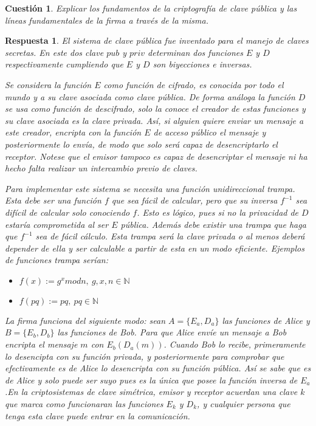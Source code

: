 \documentclass[
  a4paper,
  spanish,
  12pt,
]{scrartcl}
\theoremstyle{ejercicio-style}
\newtheorem{ejer}{Cuestión}
\theoremstyle{remark-style}
\newtheorem*{sol}{Respuesta}
\theoremstyle{teorema-style}
\begin{document}
\begin{ejer}
  Explicar los fundamentos de la criptografía de clave pública y las líneas fundamentales de la firma a través de la misma.
\end{ejer}
\begin{sol}

  El sistema de clave pública fue inventado para el manejo de claves secretas. En este dos clave $pub$ y $priv$ determinan dos funciones $E$ y $D$ respectivamente cumpliendo que $E$ y $D$ son biyecciones e inversas.

  Se considera la función $E$ como función de cifrado, es conocida por todo el mundo y a su clave asociada como clave pública. De forma análoga la función $D$ se usa como función de descifrado, solo la conoce el creador de estas funciones y su clave asociada es la clave privada. Así, si alguien quiere enviar un mensaje a este creador, encripta con la función $E$ de acceso público el mensaje y posteriormente lo envía, de modo que solo será capaz de desencriptarlo el receptor. Notese que el emisor tampoco es capaz de desencriptar el mensaje ni ha hecho falta realizar un intercambio previo de claves.

  Para implementar este sistema se necesita una función unidireccional trampa. Esta debe ser una función $f$ que sea \emph{fácil} de calcular, pero que su inversa $f^{-1}$ sea \emph{difícil} de calcular solo conociendo $f$. Esto es lógico, pues si no la privacidad de $D$ estaría comprometida al ser $E$ pública. Además debe existir una \emph{trampa} que haga que $f^{-1}$ sea de fácil cálculo. Esta \emph{trampa} será la clave privada o al menos deberá depender de ella y ser calculable a partir de esta en un modo eficiente. Ejemplos de funciones trampa serían:

  \begin{itemize}
  \item $f(x) := g^x mod n,\ g,x,n\in \mathbb{N}$ 
  \item $f(pq) := pq,\ pq\in \mathbb{N}$ 
  \end{itemize}

  La firma funciona del siguiente modo:  sean $A = \{ E_a, D_a \}$ las funciones de Alice y $B = \{ E_b, D_b \}$ las funciones de Bob. Para que Alice envíe un mensaje a Bob encripta el mensaje $m$ con $E_b(D_a(m))$. Cuando Bob lo recibe, primeramente lo desencipta con su función privada, y posteriormente para comprobar que efectivamente es de Alice lo desencripta con su función pública. Así se sabe que es de Alice y solo puede ser suyo pues es la única que posee la función inversa de $E_a$.En la criptosistemas de clave simétrica, emisor y receptor acuerdan una clave $k$ que marca como funcionaran las funciones $E_k$ y $D_k$, y cualquier persona que tenga esta clave puede entrar en la comunicación.

\end{sol}
\end{document}
